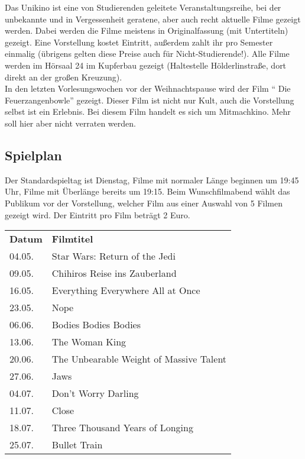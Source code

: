 Das Unikino ist eine von Studierenden geleitete Veranstaltungsreihe, bei der
unbekannte und in Vergessenheit geratene, aber auch recht aktuelle Filme
gezeigt werden. Dabei werden die Filme meistens in Originalfassung (mit
Untertiteln) gezeigt. Eine Vorstellung kostet  Eintritt, außerdem zahlt
ihr pro Semester einmalig  (übrigens gelten diese Preise auch für
Nicht-Studierende!). Alle Filme werden im Hörsaal 24 im Kupferbau gezeigt
(Haltestelle Hölderlinstraße, dort direkt an der großen Kreuzung).\\ 
In den letzten Vorlesungswochen vor der Weihnachtspause wird der Film 
"` Die Feu\-er\-zang\-en\-bow\-le"' gezeigt. Dieser Film ist nicht nur Kult,
auch die Vorstellung selbst ist ein Erlebnis. Bei diesem Film handelt es sich 
um Mitmachkino. Mehr soll hier aber nicht verraten werden.


\vspace*{-1em}

\subsection*{Spielplan}
Der Standardspieltag ist Dienstag, Filme mit normaler Länge beginnen um 19:45
Uhr, Filme mit Überlänge bereits um 19:15. Beim Wunschfilmabend wählt das
Publikum vor der Vorstellung, welcher Film aus einer Auswahl von 5 Filmen
gezeigt wird. Der Eintritt pro Film beträgt 2 Euro. 

\renewcommand{\arraystretch}{1.2}

\begin{tabular}{l l}
\textbf{Datum} & \textbf{Filmtitel} \\
04.05. & Star Wars: Return of the Jedi \\
09.05. & Chihiros Reise ins Zauberland \\
16.05. & Everything Everywhere All at Once \\
23.05. & Nope \\
06.06. & Bodies Bodies Bodies \\
13.06. & The Woman King \\
20.06. & The Unbearable Weight of Massive Talent \\
27.06. & Jaws \\
04.07. & Don't Worry Darling \\
11.07. & Close \\
18.07. & Three Thousand Years of Longing \\
25.07. & Bullet Train \\
\end{tabular}

